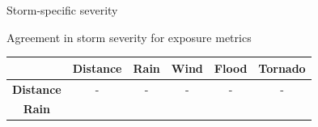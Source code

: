 \documentclass[ignorenonframetext,]{beamer}
\begin{document}
\begin{frame}{Storm-specific severity}

\begin{center}
\large Agreement in storm severity for exposure metrics
\end{center}

\begin{longtable}[]{@{}cccccc@{}}
\toprule
\begin{minipage}[b]{0.17\columnwidth}\centering\strut
~\strut
\end{minipage} & \begin{minipage}[b]{0.13\columnwidth}\centering\strut
Distance\strut
\end{minipage} & \begin{minipage}[b]{0.08\columnwidth}\centering\strut
Rain\strut
\end{minipage} & \begin{minipage}[b]{0.08\columnwidth}\centering\strut
Wind\strut
\end{minipage} & \begin{minipage}[b]{0.09\columnwidth}\centering\strut
Flood\strut
\end{minipage} & \begin{minipage}[b]{0.10\columnwidth}\centering\strut
Tornado\strut
\end{minipage}\tabularnewline
\midrule
\endhead
\begin{minipage}[t]{0.17\columnwidth}\centering\strut
\textbf{Distance}\strut
\end{minipage} & \begin{minipage}[t]{0.13\columnwidth}\centering\strut
-\strut
\end{minipage} & \begin{minipage}[t]{0.08\columnwidth}\centering\strut
-\strut
\end{minipage} & \begin{minipage}[t]{0.08\columnwidth}\centering\strut
-\strut
\end{minipage} & \begin{minipage}[t]{0.09\columnwidth}\centering\strut
-\strut
\end{minipage} & \begin{minipage}[t]{0.10\columnwidth}\centering\strut
-\strut
\end{minipage}\tabularnewline
\begin{minipage}[t]{0.17\columnwidth}\centering\strut
\textbf{Rain}\strut
\end{minipage} & \begin{minipage}[t]{0.13\columnwidth}\centering\strut

\end{minipage}
\end{longtable}
\end{frame}
\end{document}
